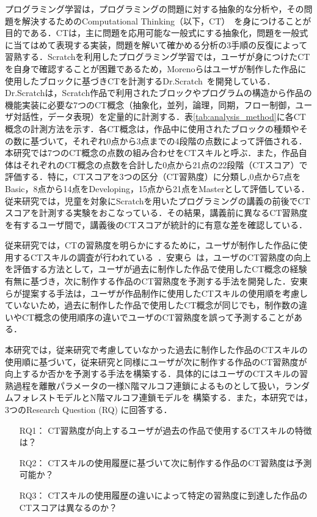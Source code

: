 \documentclass[submit]{ipsj}
\begin{document}
プログラミング学習は，プログラミングの問題に対する抽象的な分析や，その問題を解決するためのComputational Thinking（以下，CT）~\cite{Wing_2006}を身につけることが目的である．CTは，主に問題を応用可能な一般式にする抽象化，問題を一般式に当てはめて表現する実装，問題を解いて確かめる分析の3手順の反復によって習熟する．Scratchを利用したプログラミング学習では，ユーザが身につけたCTを自身で確認することが困難であるため，Morenoらはユーザが制作した作品に使用したブロックに基づきCTを計測するDr.Scratch~\cite{Moreno_2015}を開発している．Dr.Scratchは，Scratch作品で利用されたブロックやプログラムの構造から作品の機能実装に必要な7つのCT概念（抽象化，並列，論理，同期，フロー制御，ユーザ対話性，データ表現）を定量的に計測する．表\ref{tab:analysis_method}に各CT概念の計測方法を示す．各CT概念は，作品中に使用されたブロックの種類やその数に基づいて，それぞれ0点から3点までの4段階の点数によって評価される．本研究では7つのCT概念の点数の組み合わせをCTスキルと呼ぶ．また，作品自体はそれぞれのCT概念の点数を合計した0点から21点の22段階（CTスコア）で評価する．特に，CTスコアを3つの区分（CT習熟度）に分類し,0点から7点をBasic，8点から14点をDeveloping，15点から21点をMasterとして評価している．従来研究では，児童を対象にScratchを用いたプログラミングの講義の前後でCTスコアを計測する実験をおこなっている．その結果，講義前に異なるCT習熟度を有するユーザ間で，講義後のCTスコアが統計的に有意な差を確認している\cite{Moreno_2015}\cite{WiPSCE-Jesus}\cite{IDC2019-Troiano}．


従来研究では，CTの習熟度を明らかにするために，ユーザが制作した作品に使用するCTスキルの調査が行われている~\cite{Yang_2015}\cite{Troiano_2019}．安東ら~\cite{Ando_2021}は，ユーザのCT習熟度の向上を評価する方法として，ユーザが過去に制作した作品で使用したCT概念の経験有無に基づき，次に制作する作品のCT習熟度を予測する手法を開発した．安東らが提案する手法は，ユーザが作品制作に使用したCTスキルの使用順を考慮していないため，過去に制作した作品で使用したCT概念が同じでも，制作数の違いやCT概念の使用順序の違いでユーザのCT習熟度を誤って予測することがある．

本研究では，従来研究\cite{Ando_2021}で考慮していなかった過去に制作した作品のCTスキルの使用順に基づいて，従来研究と同様にユーザが次に制作する作品のCT習熟度が向上するか否かを予測する手法を構築する．具体的にはユーザのCTスキルの習熟過程を離散パラメータの一様N階マルコフ連鎖によるものとして扱い，ランダムフォレストモデルとN階マルコフ連鎖モデルを
構築する．また，本研究では，3つのResearch Question (RQ) に回答する．

\begin{itemize}
\item[RQ1：]CT習熟度が向上するユーザが過去の作品で使用するCTスキルの特徴は？
\item[RQ2：]CTスキルの使用履歴に基づいて次に制作する作品のCT習熟度は予測可能か？
\item[RQ3：]CTスキルの使用履歴の違いによって特定の習熟度に到達した作品のCTスコアは異なるのか？
\end{itemize}
\end{document}
